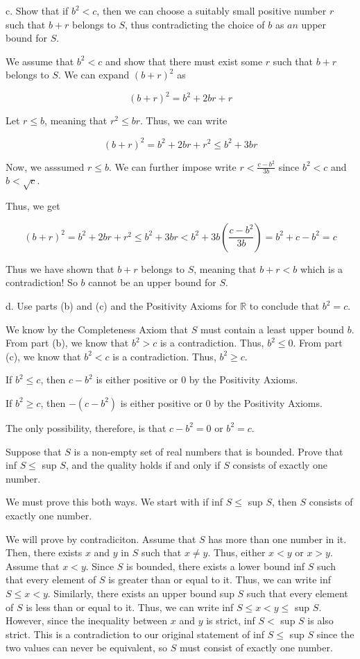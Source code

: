 \documentclass[addpoints]{exam}
\begin{document}
\begin{questions}
c. Show that if $b^2 < c$, then we can choose a suitably small positive number $r$ such that $b + r$ belongs 
to $S$, thus contradicting the choice of $b$ as $an$ upper bound for $S$.

We assume that $b^2 < c$ and show that there must exist some $r$ such that $b + r$ belongs to $S$. We can expand $(b + r)^2$ as 

\[(b + r)^2 = b^2 + 2br + r\]

Let $r \leq b$, meaning that $r^2 \leq br$. Thus, we can write

\[(b + r)^2 = b^2 + 2br + r^2 \leq b^2 + 3br\]

Now, we asssumed $r \leq b$. We can further impose write $r < \frac{c - b^2}{3b}$ since $b^2 < c$ and $b < \sqrt{c}$. 

Thus, we get 

\[(b + r)^2 = b^2 + 2br + r^2 \leq b^2 + 3br < b^2 + 3b(\frac{c - b^2}{3b}) = b^2 + c - b^2 = c\]

Thus we have shown that $b + r$ belongs to $S$, meaning that $b + r < b$ which is a contradiction! So $b$ cannot be an 
upper bound for $S$.

d. Use parts (b) and (c) and the Positivity Axioms for $\mathbb{R}$ to conclude that $b^2 = c$. 

We know by the Completeness Axiom that $S$ must contain a least upper bound $b$. From part
(b), we know that $b^2 > c$ is a contradiction. Thus, $b^2 \leq 0$. From part (c), 
we know that $b^2 < c$ is a contradiction. Thus, $b^2 \geq c$. 

If $b^2 \leq c$, then $c - b^2$ is either positive or 0 by the Positivity Axioms. 

If $b^2 \geq c$, then $-(c - b^2)$ is either positive or 0 by the Positivity Axioms.

The only possibility, therefore, is that $c - b^2 = 0$ or $b^2 = c$. 

\question Suppose that $S$ is a non-empty set of real numbers that is bounded. Prove
that inf $S \leq$ sup $S$, and the quality holds if and only if $S$ consists of exactly
one number.

We must prove this both ways. We start with if inf $S \leq$ sup $S$, then $S$ consists of exactly one number.

We will prove by contradiciton. Assume that $S$ has more than one number in it. Then, there exists $x$ and $y$ 
in $S$ such that $x \neq y$. Thus, either $x < y$ or $x > y$. Assume that $x < y$. Since $S$ is bounded, there exists a lower bound 
inf $S$ such that every element of $S$ is greater than or equal to it. Thus, we can write inf $S \leq x < y$. 
Similarly, there exists an upper bound sup $S$ such that every element of $S$ is less than or equal to it. 
Thus, we can write inf $S \leq x < y \leq$ sup $S$. However, since the inequality between $x$ and $y$ is strict, 
inf $S <$ sup $S$ is also strict. This is a contradiction to our original statement of inf $S \leq$ sup $S$ since the
two values can never be equivalent, so $S$ must consist of exactly one number.


\end{questions}
\end{document}
